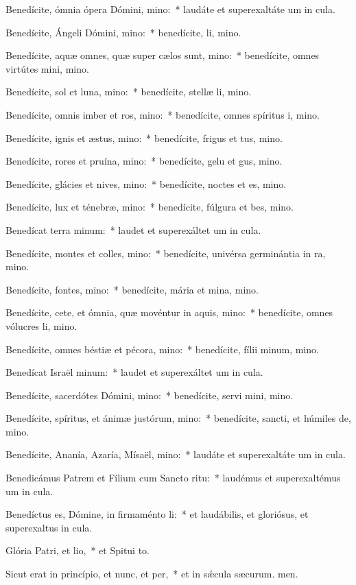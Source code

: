 \item Benedícite, ómnia ópera Dómini, mino:~* laudáte et superexaltáte um in cula.
\item Benedícite, Ángeli Dómini, mino:~* benedícite, li, mino.
\item Benedícite, aquæ omnes, quæ super cælos sunt, mino:~* benedícite, omnes virtútes mini, mino.
\item Benedícite, sol et luna, mino:~* benedícite, stellæ li, mino.
\item Benedícite, omnis imber et ros, mino:~* benedícite, omnes spíritus i, mino.
\item Benedícite, ignis et æstus, mino:~* benedícite, frigus et tus, mino.
\item Benedícite, rores et pruína, mino:~* benedícite, gelu et gus, mino.
\item Benedícite, glácies et nives, mino:~* benedícite, noctes et es, mino.
\item Benedícite, lux et ténebræ, mino:~* benedícite, fúlgura et bes, mino.
\item Benedícat terra minum:~* laudet et superexáltet um in cula.
\item Benedícite, montes et colles, mino:~* benedícite, univérsa germinántia in ra, mino.
\item Benedícite, fontes, mino:~* benedícite, mária et mina, mino.
\item Benedícite, cete, et ómnia, quæ movéntur in aquis, mino:~* benedícite, omnes vólucres li, mino.
\item Benedícite, omnes béstiæ et pécora, mino:~* benedícite, fílii minum, mino.
\item Benedícat Israël minum:~* laudet et superexáltet um in cula.
\item Benedícite, sacerdótes Dómini, mino:~* benedícite, servi mini, mino.
\item Benedícite, spíritus, et ánimæ justórum, mino:~* benedícite, sancti, et húmiles de, mino.
\item Benedícite, Ananía, Azaría, Mísaël, mino:~* laudáte et superexaltáte um in cula.
\item Benedicámus Patrem et Fílium cum Sancto ritu:~* laudémus et superexaltémus um in cula.
\item Benedíctus es, Dómine, in firmaménto li:~* et laudábilis, et gloriósus, et superexaltus in cula.
\item Glória Patri, et lio,~* et Spitui to.
\item Sicut erat in princípio, et nunc, et per,~* et in sǽcula sæcurum. men.
